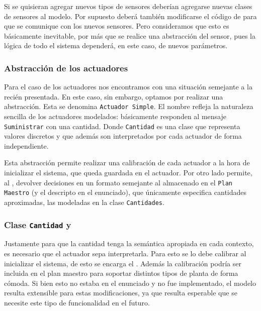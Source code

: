           Si se quisieran agregar nuevos tipos de sensores deber\'ian agregarse nuevas
          clases de sensores al modelo. Por supuesto deber\'a tambi\'en modificarse
          el c\'odigo de \condiciones{} para que se comunique
          con los nuevos sensores. Pero consideramos que esto es b\'asicamente inevitable,
          por m\'as que se realice una abstracci\'on del sensor, pues la l\'ogica
          de todo el sistema depender\'a, en este caso, de nuevos par\'ametros.

      \subsubsection{Abstracci\'on de los actuadores}
          Para el caso de los actuadores nos encontramos con una situaci\'on semejante
          a la reci\'en presentada. En este caso, sin embargo, optamos por realizar
          una abstracci\'on. Esta se denomina \texttt{Actuador Simple}. El nombre
          refleja la naturaleza sencilla de los actuadores modelados: b\'asicamente
          responden al mensaje \texttt{Suministrar} con una cantidad. Donde
          \texttt{Cantidad} es una clase que representa valores discretos y que adem\'as
          son interpretados por cada actuador de forma independiente.

          Esta abstracci\'on permite realizar una calibraci\'on de cada actuador a la
          hora de inicializar el sistema, que queda
          guardada en el actuador. Por otro lado permite, al \decisiones{},
          devolver decisiones en un formato semejante al almacenado en el
          \texttt{Plan Maestro} (y el descripto en el enunciado), que \'unicamente
          especifica cantidades aproximadas, las modeladas en la clase
          \texttt{Cantidades}.

      \subsubsection{Clase \texttt{Cantidad} y \calibrador{}}
          Justamente para que la cantidad tenga la sem\'antica apropiada en cada
          contexto, es necesario que el actuador sepa interpretarla.
          Para esto se lo debe calibrar al inicializar el sistema, de esto se
          encarga el \calibrador{}. Adem\'as la calibraci\'on podr\'ia ser incluida
          en el plan maestro para soportar distintos tipos de planta de forma
          c\'omoda. Si bien esto no estaba en el enunciado y no fue implementado,
          el modelo resulta extensible para estas modificaciones, ya que resulta
          esperable que se necesite este tipo de funcionalidad en el futuro.

